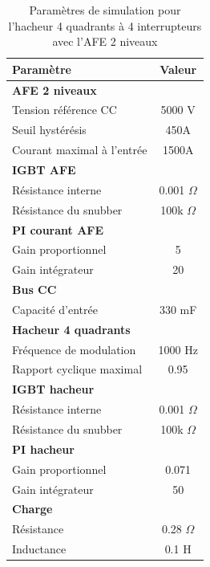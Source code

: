 \begin{table}[htb]
\centering
\begin{tabular}{|l|c|} 
  \hline
  \textbf{Paramètre} & \textbf{Valeur}  \\
  \hline\hline \hline
  \multicolumn{2}{|l|}{\textbf{AFE 2 niveaux}}\\ \hline \hline 
  Tension référence CC & 5000 V\\ \hline
  Seuil hystérésis & 450A\\ \hline
  Courant maximal à l'entrée& 1500A \\ \hline \hline
  \multicolumn{2}{|l|}{\textbf{IGBT AFE}}\\ \hline
  Résistance interne & 0.001 $\Omega$\\
  Résistance du snubber & 100k $\Omega$\\ \hline \hline
   \multicolumn{2}{|l|}{\textbf{PI courant AFE}}\\ \hline
  Gain proportionnel & 5 \\
  Gain intégrateur & 20 \\ \hline \hline
  \multicolumn{2}{|l|}{\textbf{Bus CC}}\\ \hline
  Capacité d'entrée & 330 mF\\
  \hline \hline \hline
  
  \multicolumn{2}{|l|}{\textbf{Hacheur 4 quadrants}}\\ \hline \hline
  Fréquence de modulation & 1000 Hz\\ \hline
  Rapport cyclique maximal & 0.95 \\ \hline \hline
  \multicolumn{2}{|l|}{\textbf{IGBT hacheur}}\\ \hline
  Résistance interne & 0.001 $\Omega$\\
  Résistance du snubber & 100k $\Omega$\\ \hline \hline
   \multicolumn{2}{|l|}{\textbf{PI hacheur}}\\ \hline
  Gain proportionnel & 0.071 \\
  Gain intégrateur & 50 \\ \hline \hline
  \multicolumn{2}{|l|}{\textbf{Charge}}\\ \hline
  Résistance & 0.28 $\Omega$\\
  Inductance & 0.1 H\\
  \hline
\end{tabular}
\caption{Paramètres de simulation pour l'hacheur 4 quadrants à 4 interrupteurs avec l'AFE 2 niveaux}
\label{p_AF_hash}
\end{table}
\clearpage

